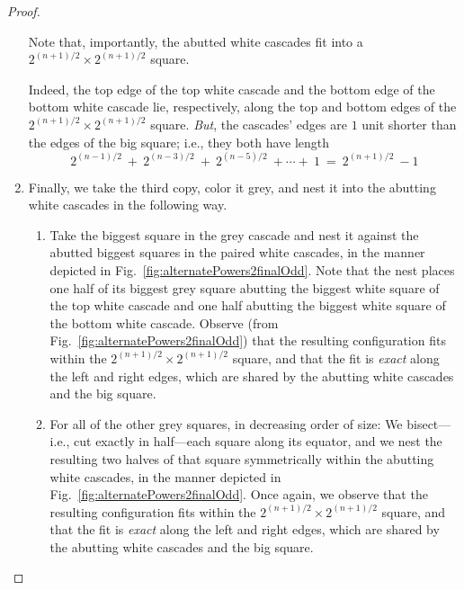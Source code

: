 \begin{proof}
\begin{enumerate}
Note that, importantly, the abutted white cascades fit into a $2^{(n+1)/2} \times 2^{(n+1)/2}$ square.

\bigskip

\noindent {}

\bigskip

Indeed, the top edge of the top white cascade and the bottom edge of the bottom white cascade lie, respectively, along the top and bottom edges of the $2^{(n+1)/2} \times 2^{(n+1)/2}$ square.  {\em But}, the cascades' edges are $1$ unit shorter than the edges of the big square; i.e., they both have length
\[
2^{(n-1)/2} \ + \ 2^{(n-3)/2} \ + \ 2^{(n-5)/2} \ + \cdots + \ 1 \ = \ 2^{(n+1)/2} \ - 1
\]

\medskip\item
Finally, we take the third copy, color it grey, and nest it into the abutting white cascades in the following way.
  \begin{enumerate}
  \item
Take the biggest square in the grey cascade and nest it against the abutted biggest squares in the paired white cascades, in the manner depicted in Fig.~\ref{fig:alternatePowers2finalOdd}.  Note that the nest places one half of its biggest grey square abutting the biggest white square of the top white cascade and one half abutting the biggest white square of the bottom white cascade.  Observe (from Fig.~\ref{fig:alternatePowers2finalOdd}) that the resulting configuration fits within the $2^{(n+1)/2} \times 2^{(n+1)/2}$ square, and that the fit is {\em exact} along the left and right edges, which are shared by the abutting white cascades and the big square.

  \medskip\item
For all of the other grey squares, in decreasing order of size: We bisect---i.e., cut exactly in half---each square along its equator, and we nest the resulting two halves of that square symmetrically within the abutting white cascades, in the manner depicted in Fig.~\ref{fig:alternatePowers2finalOdd}.  Once again, we observe that the resulting configuration fits within the $2^{(n+1)/2} \times 2^{(n+1)/2}$ square, and that the fit is {\em exact} along the
left and right edges, which are shared by the abutting white cascades and the big square.


\end{enumerate}
\end{enumerate}
\end{proof}
